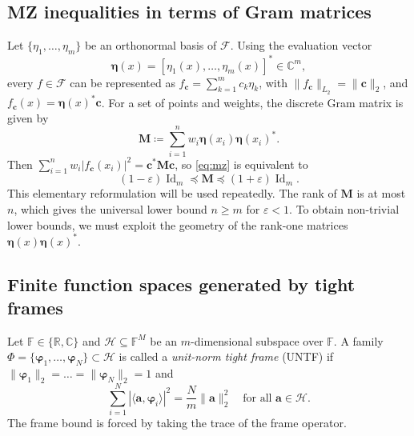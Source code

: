 \documentclass[a4paper]{amsart}
\numberwithin{equation}{section}
\DeclareMathOperator{\Id}{Id}
\begin{document}
\subsection{MZ inequalities in terms of Gram matrices}

Let $\{\eta_1,\dots,\eta_m\}$ be an orthonormal basis of $\mathcal F$.
Using the evaluation vector
\begin{equation*}
    \bm \eta(x) = [\eta_1(x), \dots, \eta_m(x)]^\ast \in\mathds C^m,
\end{equation*}
every $f\in\mathcal F$ can be represented as $f_{\bm c} = \sum_{k=1}^{m} c_k \eta_k$, with $\|f_{\bm c}\|_{L_2} = \|\bm c\|_2$, and $f_{\bm c}(x) = \bm\eta(x)^\ast\bm c$.
For a set of points and weights, the discrete Gram matrix is given by
\begin{equation}\label{eq:M}
    \bm M \coloneqq \sum_{i=1}^{n}w_i\bm\eta(x_i)\bm\eta(x_i)^\ast.
\end{equation}
Then $\sum_{i=1}^{n}w_i|f_{\bm c}(x_i)|^2 = \bm c^\ast\bm M\bm c$, so \eqref{eq:mz} is equivalent to
\begin{equation*}
    (1-\varepsilon)\Id_m
    \preceq \bm M
    \preceq (1+\varepsilon)\Id_m.
\end{equation*}
This elementary reformulation will be used repeatedly.
The rank of $\bm M$ is at most $n$, which gives the universal lower bound $n\ge m$ for $\varepsilon<1$.
To obtain non-trivial lower bounds, we must exploit the geometry of the rank-one matrices $\bm\eta(x)\bm\eta(x)^\ast$.



\subsection{Finite function spaces generated by tight frames}

Let $\mathds F\in\{\mathds R,\mathds C\}$ and $\mathcal H\subseteq\mathds F^M$ be an $m$-dimensional subspace over $\mathds F$.
A family $\Phi = \{\bm\varphi_1,\dots,\bm\varphi_N\}\subset\mathcal H$ is called a \emph{unit-norm tight frame} (UNTF) if $\|\bm\varphi_1\|_2 = \dots = \|\bm\varphi_N\|_2 = 1$ and
\begin{equation}
    \sum_{i=1}^{N} | \langle \bm a,\bm\varphi_i\rangle|^2
    = \frac Nm \| \bm a\|_2^2
    \quad\text{for all } \bm a\in\mathcal H .
\end{equation}
The frame bound is forced by taking the trace of the frame operator.
\end{document}
